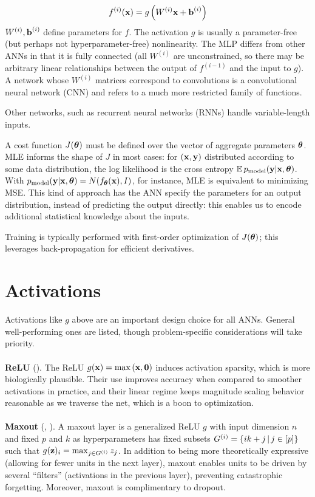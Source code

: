 \documentclass{article}
\begin{document}
$$
f^{(i)}(\textbf{x})=g\left({W^{(i)}\textbf{x}+\textbf{b}^{(i)}}\right)
$$
$W^{(i)},\textbf{b}^{(i)}$ define parameters for $f$. The activation $g$ is usually a parameter-free (but perhaps not hyperparameter-free) nonlinearity. The MLP differs from other ANNs in that it is fully connected (all $W^{(i)}$ are unconstrained, so there may be arbitrary linear relationships between the output of $f^{(i-1)}$ and the input to $g$). A network whose $W^{(i)}$ matrices correspond to convolutions is a convolutional neural network (CNN) and refers to a much more restricted family of functions.

Other networks, such as recurrent neural networks (RNNs) handle variable-length inputs.

A cost function $J({\boldsymbol\theta})$ must be defined over the vector of aggregate parameters ${\boldsymbol\theta}$. MLE informs the shape of $J$ in most cases: for $(\textbf{x},\textbf{y})$ distributed according to some data distribution, the log likelihood is the cross entropy $\operatorname{\mathbb{E}} p_\text{model}(\textbf{y}|\textbf{x},{\boldsymbol\theta})$. With $p_\text{model}(\textbf{y}|\textbf{x},{\boldsymbol\theta})=N(f_{\boldsymbol\theta}(\textbf{x}),I)$, for instance, MLE is equivalent to minimizing MSE. This kind of approach has the ANN specify the parameters for an output distribution, instead of predicting the output directly: this enables us to encode additional statistical knowledge about the inputs.

Training is typically performed with first-order optimization of $J({\boldsymbol\theta})$; this leverages back-propagation for efficient derivatives.

\section{Activations}

Activations like $g$ above are an important design choice for all ANNs. General well-performing ones are listed, though problem-specific considerations will take priority.
\\\\
\noindent
\textbf{ReLU} (). The ReLU $g(\textbf{x})=\max\left({\textbf{x},\textbf{0}}\right)$ induces activation sparsity, which is more biologically plausible. Their use improves accuracy when compared to smoother activations in practice, and their linear regime keeps magnitude scaling behavior reasonable as we traverse the net, which is a boon to optimization.
\\\\
\noindent
\textbf{Maxout} (, ). A maxout layer is a generalized ReLU $g$ with input dimension $n$ and fixed $p$ and $k$ as hyperparameters has fixed subsets $G^{(i)}=\left\{ ik+j \,\middle|\, j\in[p] \right\}$ such that $g(\textbf{z})_i=\max_{j\in G^{(i)}}z_j$. In addition to being more theoretically expressive (allowing for fewer units in the next layer), maxout enables units to be driven by several ``filters'' (activations in the previous layer), preventing catastrophic forgetting. Moreover, maxout is complimentary to dropout.
\end{document}
